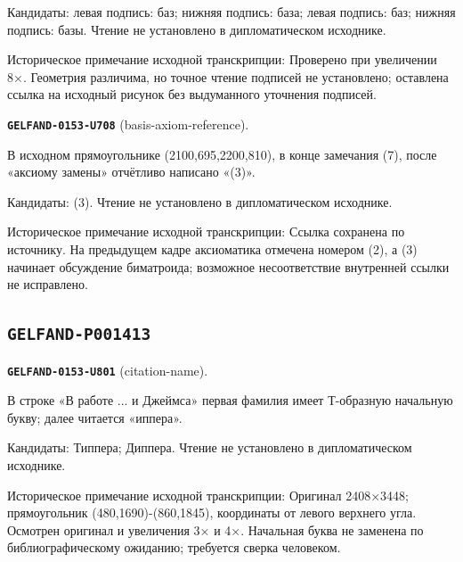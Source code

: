 Кандидаты: левая подпись: баз; нижняя подпись: база; левая подпись: баз; нижняя подпись: базы. Чтение не установлено в дипломатическом исходнике.\par
Историческое примечание исходной транскрипции: Проверено при увеличении 8×. Геометрия различима, но точное чтение подписей не установлено; оставлена ссылка на исходный рисунок без выдуманного уточнения подписей.\par\medskip
\par\noindent\leavevmode{}\label{GELFAND-0153-U708}\textbf{\texttt{GELFAND-0153-U708}} (basis-axiom-reference).\nopagebreak[4]\par
В исходном прямоугольнике (2100,695,2200,810), в конце замечания (7), после «аксиому замены» отчётливо написано «(3)».\par
Кандидаты: (3). Чтение не установлено в дипломатическом исходнике.\par
Историческое примечание исходной транскрипции: Ссылка сохранена по источнику. На предыдущем кадре аксиоматика отмечена номером (2), а (3) начинает обсуждение биматроида; возможное несоответствие внутренней ссылки не исправлено.\par\medskip
\subsection*{\texttt{GELFAND-P001413}}
\par\noindent\leavevmode{}\label{GELFAND-0153-U801}\textbf{\texttt{GELFAND-0153-U801}} (citation-name).\nopagebreak[4]\par
В строке «В работе ... и Джеймса» первая фамилия имеет Т-образную начальную букву; далее читается «иппера».\par
Кандидаты: Типпера; Диппера. Чтение не установлено в дипломатическом исходнике.\par
Историческое примечание исходной транскрипции: Оригинал 2408×3448; прямоугольник (480,1690)-(860,1845), координаты от левого верхнего угла. Осмотрен оригинал и увеличения 3× и 4×. Начальная буква не заменена по библиографическому ожиданию; требуется сверка человеком.\par\medskip
